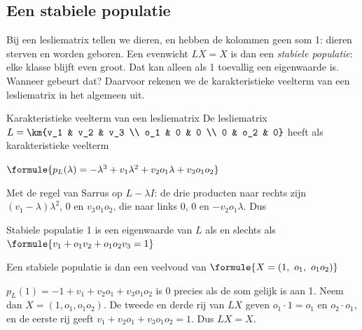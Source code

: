 \begin{oefeningen}
\end{oefeningen}

\subsection{Een stabiele populatie}

Bij een lesliematrix tellen we dieren, en hebben de kolommen geen som 1: dieren sterven en worden geboren. Een evenwicht $LX = X$ is dan een \textit{stabiele populatie}: elke klasse blijft even groot. Dat kan alleen als 1 toevallig een eigenwaarde is. Wanneer gebeurt dat? Daarvoor rekenen we de karakteristieke veelterm van een lesliematrix in het algemeen uit.

\begin{theorie}
\begin{stelling}{Karakteristieke veelterm van een lesliematrix}
De lesliematrix $L = \km{v_1 & v_2 & v_3 \\ o_1 & 0 & 0 \\ 0 & o_2 & 0}$ heeft als karakteristieke veelterm

\vspace{1mm}
\qquad $\formule{p_L(\lambda) = -\lambda^3 + v_1\lambda^2 + v_2o_1\lambda + v_3o_1o_2}$
\end{stelling}

\begin{bewijs}
Met de regel van Sarrus op $L - \lambda I$: de drie producten naar rechts zijn $(v_1 - \lambda)\lambda^2$, $0$ en $v_3o_1o_2$, die naar links $0$, $0$ en $-v_2o_1\lambda$. Dus
\end{bewijs}

\begin{stelling}{Stabiele populatie}
1 is een eigenwaarde van $L$ als en slechts als \qquad $\formule{v_1 + o_1v_2 + o_1o_2v_3 = 1}$

\vspace{1mm}
Een stabiele populatie is dan een veelvoud van \quad $\formule{X = (1,\ o_1,\ o_1o_2)}$
\end{stelling}

\begin{bewijs}
$p_L(1) = -1 + v_1 + v_2o_1 + v_3o_1o_2$ is 0 precies als de som gelijk is aan 1. Neem dan $X = (1, o_1, o_1o_2)$. De tweede en derde rij van $LX$ geven $o_1 \cdot 1 = o_1$ en $o_2 \cdot o_1$, en de eerste rij geeft $v_1 + v_2o_1 + v_3o_1o_2 = 1$. Dus $LX = X$.
\end{bewijs}
\end{theorie}

